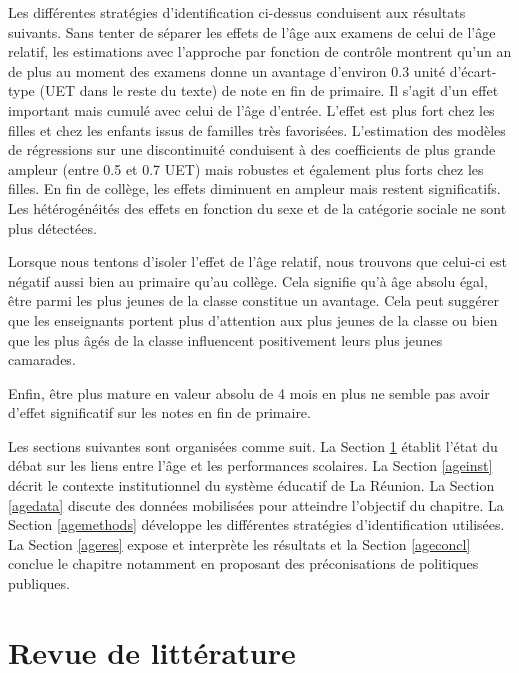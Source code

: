 \documentclass[
]{book}
\begin{document}
\quad Les différentes stratégies d'identification ci-dessus conduisent aux résultats suivants. Sans tenter de séparer les effets de l'âge aux examens de celui de l'âge relatif, les estimations avec l'approche par fonction de contrôle montrent qu'un an de plus au moment des examens donne un avantage d'environ 0.3 unité d'écart-type (UET dans le reste du texte) de note en fin de primaire. Il s'agit d'un effet important mais cumulé avec celui de l'âge d'entrée. L'effet est plus fort chez les filles et chez les enfants issus de familles très favorisées. L'estimation des modèles de régressions sur une discontinuité conduisent à des coefficients de plus grande ampleur (entre 0.5 et 0.7 UET) mais robustes et également plus forts chez les filles. En fin de collège, les effets diminuent en ampleur mais restent significatifs. Les hétérogénéités des effets en fonction du sexe et de la catégorie sociale ne sont plus détectées.

Lorsque nous tentons d'isoler l'effet de l'âge relatif, nous trouvons que celui-ci est négatif aussi bien au primaire qu'au collège. Cela signifie qu'à âge absolu égal, être parmi les plus jeunes de la classe constitue un avantage. Cela peut suggérer que les enseignants portent plus d'attention aux plus jeunes de la classe ou bien que les plus âgés de la classe influencent positivement leurs plus jeunes camarades.

Enfin, être plus mature en valeur absolu de 4 mois en plus ne semble pas avoir d'effet significatif sur les notes en fin de primaire.

\quad Les sections suivantes sont organisées comme suit. La Section \ref{agelitt} établit l'état du débat sur les liens entre l'âge et les performances scolaires. La Section \ref{ageinst} décrit le contexte institutionnel du système éducatif de La Réunion. La Section \ref{agedata} discute des données mobilisées pour atteindre l'objectif du chapitre. La Section \ref{agemethods} développe les différentes stratégies d'identification utilisées. La Section \ref{ageres} expose et interprète les résultats et la Section \ref{ageconcl} conclue le chapitre notamment en proposant des préconisations de politiques publiques.

\hypertarget{agelitt}{%
\section{Revue de littérature}\label{agelitt}}
\end{document}
